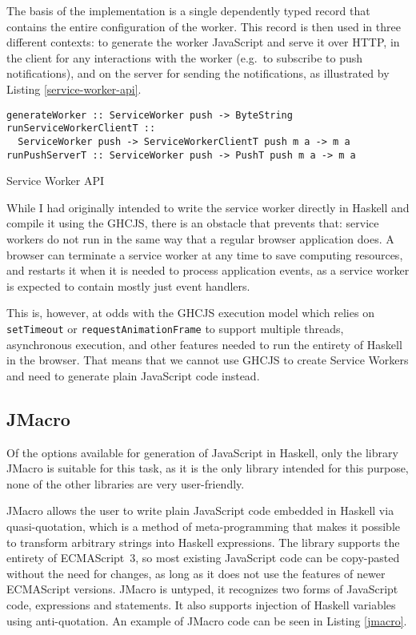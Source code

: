 \documentclass[english,odsaz]{fitthesis}
\begin{document}
The basis of the implementation is a single dependently typed record that
contains the entire configuration of the worker. This record is then used in
three different contexts: to generate the worker JavaScript and serve it over
HTTP, in the client for any interactions with the worker (e.g.~to subscribe to
push notifications), and on the server for sending the notifications, as
illustrated by Listing \ref{service-worker-api}.

\begin{listing}[htbp]
\begin{verbatim}
generateWorker :: ServiceWorker push -> ByteString
runServiceWorkerClientT ::
  ServiceWorker push -> ServiceWorkerClientT push m a -> m a
runPushServerT :: ServiceWorker push -> PushT push m a -> m a
\end{verbatim}
\caption{Service Worker API \label{service-worker-api}}
\end{listing}

While I had originally intended to write the service worker directly in Haskell
and compile it using the GHCJS, there is an obstacle that prevents that: service
workers do not run in the same way that a regular browser application does. A
browser can terminate a service worker at any time to save computing resources,
and restarts it when it is needed to process application events, as a service
worker is expected to contain mostly just event handlers.

This is, however, at odds with the GHCJS execution model which relies on
\texttt{setTimeout} or \texttt{requestAnimationFrame} to support multiple threads, asynchronous
execution, and other features needed to run the entirety of Haskell in the
browser. That means that we cannot use GHCJS to create Service Workers and need
to generate plain JavaScript code instead.

\subsection{JMacro}
\label{sec:org2ad5640}
Of the options available for generation of JavaScript in Haskell, only the
library JMacro is suitable for this task, as it is the only library intended for
this purpose, none of the other libraries are very user-friendly.

JMacro allows the user to write plain JavaScript code embedded in Haskell via
quasi-quotation, which is a method of meta-programming that makes it possible to
transform arbitrary strings into Haskell expressions. The library supports the
entirety of ECMAScript~3, so most existing JavaScript code can be
copy-pasted without the need for changes, as long as it does not use the
features of newer ECMAScript versions. JMacro is untyped, it recognizes two
forms of JavaScript code, expressions and statements. It also supports injection
of Haskell variables using anti-quotation. An example of JMacro code can be seen
in Listing \ref{jmacro}.
\end{document}
